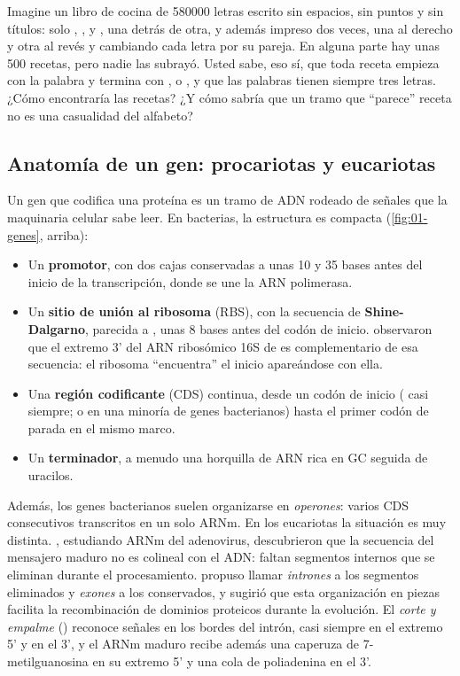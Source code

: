 \begin{intuicion}
Imagine un libro de cocina de \num{580000} letras escrito sin espacios, sin puntos y sin títulos: solo , ,  y , una detrás de otra, y además impreso dos veces, una al derecho y otra al revés y cambiando cada letra por su pareja. En alguna parte hay unas 500 recetas, pero nadie las subrayó. Usted sabe, eso sí, que toda receta empieza con la palabra  y termina con ,  o , y que las palabras tienen siempre tres letras. ¿Cómo encontraría las recetas? ¿Y cómo sabría que un tramo que ``parece'' receta no es una casualidad del alfabeto?
\end{intuicion}

\subsection{Anatomía de un gen: procariotas y eucariotas}

Un gen que codifica una proteína es un tramo de ADN rodeado de señales que la maquinaria celular sabe leer. En bacterias, la estructura es compacta (\cref{fig:01-genes}, arriba):

\begin{itemize}
  \item Un \textbf{promotor}, con dos cajas conservadas a unas 10 y 35 bases antes del inicio de la transcripción, donde se une la ARN polimerasa.
  \item Un \textbf{sitio de unión al ribosoma} (RBS), con la secuencia de \textbf{Shine-Dalgarno}, parecida a , unas 8 bases antes del codón de inicio. \textcite{c01-shine1974} observaron que el extremo 3' del ARN ribosómico 16S de  es complementario de esa secuencia: el ribosoma ``encuentra'' el inicio apareándose con ella.
  \item Una \textbf{región codificante} (CDS) continua, desde un codón de inicio ( casi siempre;  o  en una minoría de genes bacterianos) hasta el primer codón de parada en el mismo marco.
  \item Un \textbf{terminador}, a menudo una horquilla de ARN rica en GC seguida de uracilos.
\end{itemize}

Además, los genes bacterianos suelen organizarse en \emph{operones}: varios CDS consecutivos transcritos en un solo ARNm. En los eucariotas la situación es muy distinta. \textcite{c01-berget1977}, estudiando ARNm del adenovirus, descubrieron que la secuencia del mensajero maduro no es colineal con el ADN: faltan segmentos internos que se eliminan durante el procesamiento. \textcite{c01-gilbert1978} propuso llamar \emph{intrones} a los segmentos eliminados y \emph{exones} a los conservados, y sugirió que esta organización en piezas facilita la recombinación de dominios proteicos durante la evolución. El \emph{corte y empalme} () reconoce señales en los bordes del intrón, casi siempre  en el extremo 5' y  en el 3', y el ARNm maduro recibe además una caperuza de 7-metilguanosina en su extremo 5' y una cola de poliadenina en el 3'.

